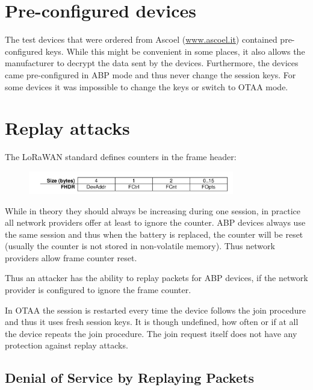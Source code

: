 \section{Pre-configured devices}\label{h.7mkfizapvt5a}

{The test devices that were ordered from Ascoel
(\href{http://www.ascoel.it}{www.ascoel.it})
contained pre-configured keys. While this might be convenient in some
places, it also allows the manufacturer to decrypt the data sent by the
devices. Furthermore, the devices came pre-configured in ABP mode and
thus never change the session keys. For some devices it was impossible
to change the keys or switch to OTAA mode.}

\section{\texorpdfstring{{Replay
attacks}}{Replay attacks}}\label{h.eymg8atzq5bp}


{The LoRaWAN standard defines counters in the frame header:}

\begin{figure}[h!]
{\includegraphics[width=0.8\textwidth]{images/image9.png}}
\end{figure}

{While in theory they should always be increasing during one session, in
practice all network providers offer at least to ignore the counter. ABP
devices always use the same session and thus when the battery is
replaced, the counter will be reset (usually the counter is not stored in
non-volatile memory). Thus network providers allow frame counter reset.}

{Thus an attacker has the ability to replay packets for ABP devices, if
the network provider is configured to ignore the frame counter.}

{In OTAA the session is restarted every time the device follows the join
procedure and thus it uses fresh session keys. It is though undefined,
how often or if at all the device repeats the join procedure. The join
request itself does not have any protection against replay attacks.}

\subsection{Denial of Service by Replaying Packets}
\label{sec.gap_dos}

